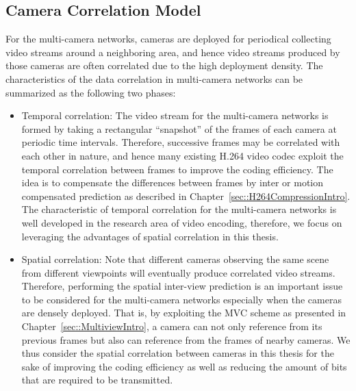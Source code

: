\subsection{Camera Correlation Model}
%
For the multi-camera networks, cameras are deployed for periodical collecting video streams around a neighboring area, and hence video streams produced by those cameras are often correlated due to the high deployment density.
The characteristics of the data correlation in multi-camera networks can be summarized as the following two phases:
\begin{itemize}
\item Temporal correlation: The video stream for the multi-camera networks is formed by taking a rectangular ``snapshot'' of the frames of each camera at periodic time intervals.
Therefore, successive frames may be correlated with each other in nature, and hence many existing H.264 video codec exploit the temporal correlation between frames to improve the coding efficiency.
The idea is to compensate the differences between frames by inter or motion compensated prediction as described in Chapter~\ref{sec::H264CompressionIntro}.
The characteristic of temporal correlation for the multi-camera networks is well developed in the research area of video encoding, therefore, we focus on leveraging the advantages of spatial correlation in this thesis.
\item Spatial correlation: Note that different cameras observing the same scene from different viewpoints will eventually produce correlated video streams.
Therefore, performing the spatial inter-view prediction is an important issue to be considered for the multi-camera networks especially when the cameras are densely deployed.
That is, by exploiting the MVC scheme as presented in Chapter~\ref{sec::MultiviewIntro}, a camera can not only reference from its previous frames but also can reference from the frames of nearby cameras.
We thus consider the spatial correlation between cameras in this thesis for the sake of improving the coding efficiency as well as reducing the amount of bits that are required to be transmitted.  
\end{itemize}
%

